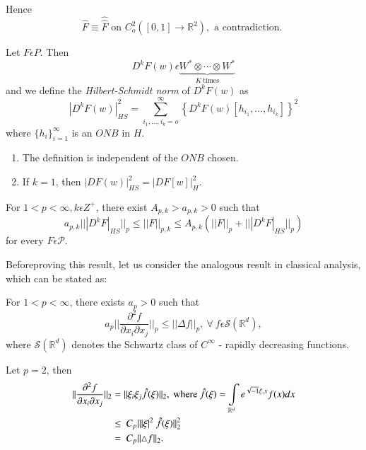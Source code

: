 Hence
$$
\hat{F} \equiv \hat{\hat{F}} \text {  on  } C^2_o ([0, 1] \to
\mathbb{R}^2), \text { a contradiction. } 
$$

\begin{definition}%
  Let $F \epsilon  P$. Then
  $$
  D^k F(w) \epsilon  \underbrace{W^*
    \otimes \cdots \otimes W^*}_{K ~\text{times}} 
  $$
  and we define the \textit{Hilbert-Schmidt norm} of $D^k F(w) $ as 
  $$
  | D^k F(w) |^2_{HS} = \sum_{i_1, \ldots, i_k=o}^{\infty} \left\{ D^k
  F(w) \left[h_{i_1}, \ldots, h_{i_k}\right] \right\}^2 
  $$
  where $\{ h_i\}^{\infty}_{i = 1}$ is an $ONB$ in $H$.
\end{definition}

\begin{remark*} %
  \begin{enumerate} [1)]
  \item The definition is independent of the $ONB$ chosen.
  \item If $k = 1$, then $| DF (w) |^{2}_{HS} = |DF [w] |^2_H$.
  \end{enumerate}
\end{remark*}

\setcounter{theorem}{7}
\begin{theorem}[Meyer]\label{chap1:thm1.8} %
  For $1 < p < \infty, k \epsilon  Z^+$, there exist $A_{p, k} > a_{p,
    k} > 0 $ such that 
  \begin{equation*}
    a_{p, k} || | D^k F |_{HS} ||_p \le || F ||_{p, k} \le A_{p, k} (||
    F||_p + || | D^k F |_{HS} ||_p ) \tag{1.5}\label{thmeq1.5}  
  \end{equation*}
  for every $F \epsilon  \mathcal{P}$.
\end{theorem}

Before\pageoriginale proving this result, let us consider the
analogous result in 
classical analysis, which can be stated as: 

For $1 < p < \infty$, there exists $a_p > 0$ such that 
\begin{equation*}
  a_p || \frac{\partial^2 f}{\partial x_i \partial x_j} ||_p \le ||
  \Delta f ||_p, ~\forall~ f \epsilon  \mathcal{S} (\mathbb{R}^d),
  \tag{1.6}\label{eq1.6}  
\end{equation*}
where $\mathcal{S} (\mathbb{R}^d)$ denotes the Schwartz class of $C^
\infty$ - rapidly decreasing functions. 

\medskip
{}
Let $p = 2$, then
\begin{align*}
  || \frac{\partial^2 f}{\partial x_i \partial x_j} ||_2 &= || \xi_i \xi
  _j \hat{f} (\xi) ||_2, ~{\rm where}~ \hat{f} (\xi) =
  \int\limits_{\mathbb {R}^d} e^{\sqrt{-1} \xi. x} f (x) dx\\ 
  & \le  ~ C_p || | \xi |^2 ~ \hat{f} (\xi) ||^2_2\\
  & =  ~ C_p || \triangle f ||_2.
\end{align*}

